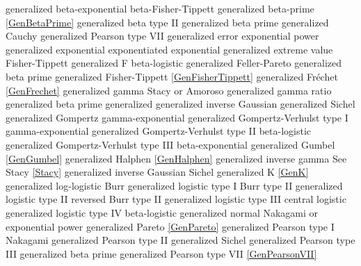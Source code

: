 generalized beta-exponential	\dotfill	beta-Fisher-Tippett					\ncite
generalized beta-prime 			\dotfill	\eqref{GenBetaPrime} 				 %
generalized beta type II		\dotfill	generalized beta prime				
generalized Cauchy				\dotfill	generalized Pearson type VII		\ncite
generalized error				\dotfill	exponential power					\ncite
generalized exponential			\dotfill	exponentiated exponential 			    %
generalized extreme value		\dotfill	Fisher-Tippett						\ncite	%
generalized F					\dotfill	beta-logistic 						\ncite	%
generalized Feller-Pareto		\dotfill	generalized beta prime				
generalized Fisher-Tippett		\dotfill	\eqref{GenFisherTippett} 			\ncite	%
generalized Fr\'{e}chet 		\dotfill	\eqref{GenFrechet} 					\ncite	%
generalized gamma 				\dotfill	Stacy or Amoroso 					\ncite	%
generalized gamma ratio			\dotfill	generalized beta prime				 	%
generalized generalized inverse Gaussian	\dotfill	generalized Sichel		
generalized Gompertz			\dotfill	gamma-exponential					
generalized Gompertz-Verhulst type I \dotfill	gamma-exponential				    	%
generalized Gompertz-Verhulst type II \dotfill	beta-logistic  					    	%
generalized Gompertz-Verhulst type III \dotfill	beta-exponential 				   		%
generalized Gumbel				\dotfill	\eqref{GenGumbel}					\ncite	%
generalized Halphen				\dotfill	\eqref{GenHalphen}					\ncite
generalized inverse gamma 		\dotfill	See Stacy \eqref{Stacy} 			\ncite	%
generalized inverse Gaussian	\dotfill	Sichel								\ncite
generalized K					\dotfill	\eqref{GenK}						\mcite{\self} 
generalized log-logistic		\dotfill	Burr 								\ncite	%
generalized logistic type I		\dotfill	Burr type II 						\ncite	%
generalized logistic type II	\dotfill	reversed Burr type II 				\ncite	%
generalized logistic type III	\dotfill	central logistic 					\ncite	%
generalized logistic type IV	\dotfill	beta-logistic 						   		%
generalized normal	 			\dotfill	Nakagami or exponential power		\ncite	%
generalized Pareto				\dotfill	\eqref{GenPareto}					\ncite	%
generalized Pearson type I		\dotfill	Nakagami							
generalized Pearson type II		\dotfill	generalized Sichel					
generalized Pearson type III	\dotfill	generalized beta prime				
generalized Pearson type VII	\dotfill	\eqref{GenPearsonVII}				\ncite
